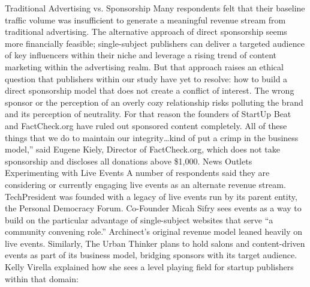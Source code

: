 Traditional Advertising vs. Sponsorship
Many respondents felt that their baseline traffic volume was insufficient
to generate a meaningful revenue stream from traditional advertising. The
alternative approach of direct sponsorship seems more financially feasible;
single-subject publishers can deliver a targeted audience of key influencers
within their niche and leverage a rising trend of content marketing within
the advertising realm. But that approach raises an ethical question that publishers
within our study have yet to resolve: how to build a direct sponsorship
model that does not create a conflict of interest. The wrong sponsor or
the perception of an overly cozy relationship risks polluting the brand and
its perception of neutrality. For that reason the founders of StartUp Beat
and FactCheck.org have ruled out sponsored content completely.
All of these things that we do to maintain our integrity…kind of put a crimp
in the business model,” said Eugene Kiely, Director of FactCheck.org, which
does not take sponsorship and discloses all donations above \$1,000.
News Outlets Experimenting with Live Events
A number of respondents said they are considering or currently engaging
live events as an alternate revenue stream. TechPresident was founded
with a legacy of live events run by its parent entity, the Personal Democracy
Forum. Co-Founder Micah Sifry sees events as a way to build on the particular
advantage of single-subject websites that serve ``a community convening
role.'' Archinect’s original revenue model leaned heavily on live events. Similarly,
The Urban Thinker plans to hold salons and content-driven events as
part of its business model, bridging sponsors with its target audience. Kelly
Virella explained how she sees a level playing field for startup publishers
within that domain:


